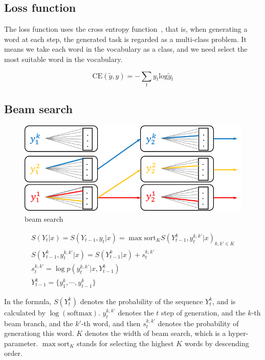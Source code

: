 \documentclass[12pt,a4paper]{article}
\begin{document}
\subsection{Loss function}
The loss function uses the cross entropy function~\cite{DBLP:conf/iccv/LinGGHD17}, that is, when generating a word at each step, the generated task is regarded as a multi-class problem. It means we take each word in the vocabulary as a class, and we need select the most suitable word in the vocabulary.

\begin{equation*}
  \mathrm{CE}(\tilde{y}, y) = - \sum_{t}{y_t \mathrm{log}\tilde{y}_t}
\end{equation*}


\subsection{Beam search}
\begin{figure}[!htbp]
  \centering
  \includegraphics[width=0.9\linewidth]{./figures/beam_search.png}
  \caption{beam search}\label{fig:beam_search}
\end{figure}
\begin{gather*}
    S(Y_t|x) = S(Y_{t-1},y_t|x) = \max \mathrm{sort}_{K}{S(Y_{t-1}^k,y_t^{k,k'}|x)_{k,k' \in K}} \\
    S(Y_{t-1}^k,y_t^{k,k'}|x) = S(Y_{t-1}^k|x) + s_t^{k,k'} \\
    s_t^{k,k'} = \log p(y_t^{k,k'}|x, Y_{t-1}^k) \\
    Y_{t-1}^k = \{y_1^k, \cdots, y_{t-1}^k\}
\end{gather*}

In the formula, $S(Y_t^k)$ denotes the probability of the sequence $Y_t^k$, and is calculated by $\log(\mathrm{softmax})$. $y_t^{k,k'}$ denotes the $t$ step of generation, and the $k$-th beam branch, and the $k'$-th word, and then $s_t^{k,k'}$ denotes the probability of generationg this word. $K$ denotes the width of beam search, which is a hyper-parameter. $\max \mathrm{sort}_{K}$ stands for selecting the highest $K$ words by descending order.
\end{document}
